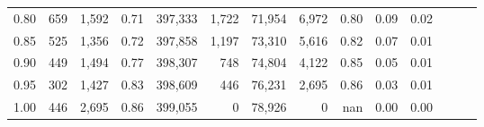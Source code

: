 \begin{tabular}{rrrrrrrrrrrrrr}
0.80 &      659 &  1,592 &  0.71 &  397,333 &    1,722 &  71,954 &   6,972 &  0.80 &  0.09 &      0.02 \\
0.85 &      525 &  1,356 &  0.72 &  397,858 &    1,197 &  73,310 &   5,616 &  0.82 &  0.07 &      0.01 \\
0.90 &      449 &  1,494 &  0.77 &  398,307 &      748 &  74,804 &   4,122 &  0.85 &  0.05 &      0.01 \\
0.95 &      302 &  1,427 &  0.83 &  398,609 &      446 &  76,231 &   2,695 &  0.86 &  0.03 &      0.01 \\
1.00 &      446 &  2,695 &  0.86 &  399,055 &        0 &  78,926 &       0 &   nan &  0.00 &      0.00 \\
\bottomrule
\end{tabular}
